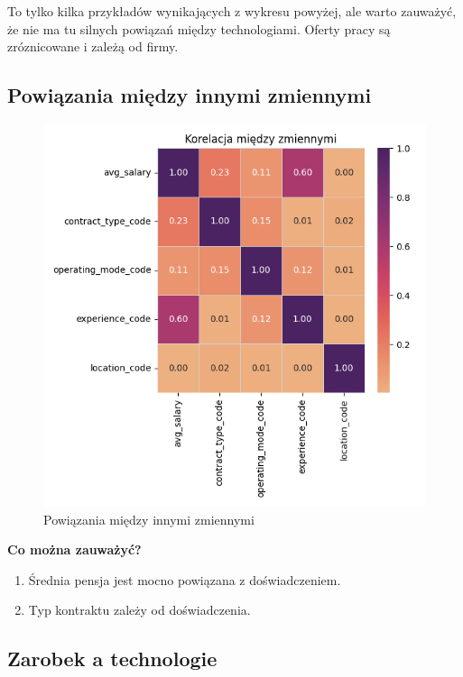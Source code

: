 \documentclass[a4paper]{article}
\begin{document}
\quad To tylko kilka przykładów wynikających z wykresu powyżej, ale warto zauważyć, że nie ma tu silnych powiązań między technologiami. Oferty pracy są zróznicowane i zależą od firmy.


\subsection{Powiązania między innymi zmiennymi}

\begin{figure}[H]
    \centering
    \includegraphics[width=\textwidth]{../analysis/plots/korelacje/korelacja_między_zmiennymi.png}
    \caption{Powiązania między innymi zmiennymi}
\end{figure}

\quad \textbf{Co można zauważyć?}

\begin{enumerate}
    \item Średnia pensja jest mocno powiązana z doświadczeniem.
    \item Typ kontraktu zależy od doświadczenia.
\end{enumerate}


\subsection{Zarobek a technologie}
\end{document}
